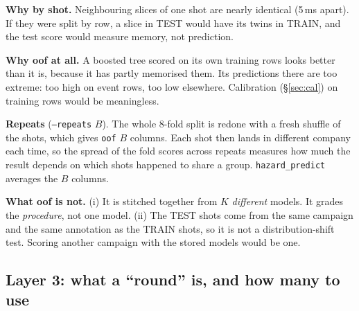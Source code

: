 \documentclass[11pt]{article}
\begin{document}
\textbf{Why by shot.} Neighbouring slices of one shot are nearly identical
(5\,ms apart). If they were split by row, a slice in TEST would have its
twins in TRAIN, and the test score would measure memory, not prediction.

\textbf{Why oof at all.} A boosted tree scored on its own training rows looks
better than it is, because it has partly memorised them. Its predictions there
are too extreme: too high on event rows, too low elsewhere. Calibration
(\S\ref{sec:cal}) on training rows would be meaningless.

\textbf{Repeats} (\texttt{--repeats} $B$). The whole 8-fold split is redone
with a fresh shuffle of the shots, which gives \texttt{oof} $B$ columns.
Each shot then lands in different company each time, so the spread of the
fold scores across repeats measures how much the result depends on which shots
happened to share a group. \texttt{hazard\_predict} averages the $B$ columns.

\textbf{What oof is not.}
(i) It is stitched together from $K$ \emph{different} models. It grades the
\emph{procedure}, not one model.
(ii) The TEST shots come from the same campaign and the same annotation as the
TRAIN shots, so it is not a distribution-shift test. Scoring another campaign
with the stored models would be one.

\subsection{Layer 3: what a ``round'' is, and how many to use}
\end{document}
